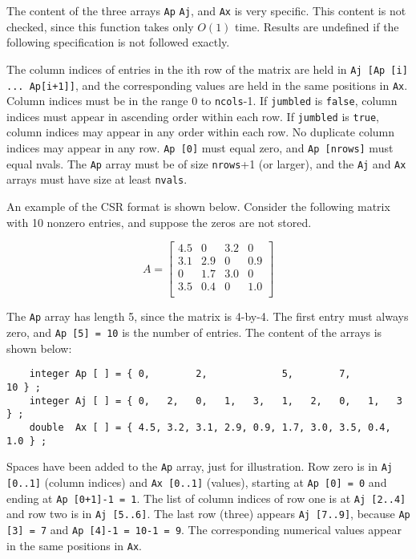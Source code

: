 The content of the three arrays \verb'Ap' \verb'Aj', and \verb'Ax' is very
specific.  This content is not checked, since this function takes only
$O(1)$ time.  Results are undefined if the following specification is not
followed exactly.

The column indices of entries in the ith row of the matrix are held in
\verb'Aj [Ap [i] ... Ap[i+1]]', and the corresponding values are held in the
same positions in \verb'Ax'.  Column indices must be in the range 0 to
\verb'ncols'-1.  If \verb'jumbled' is \verb'false', column indices must appear
in ascending order within each row.  If \verb'jumbled' is \verb'true', column
indices may appear in any order within each row.  No duplicate column indices
may appear in any row.  \verb'Ap [0]' must equal zero, and \verb'Ap [nrows]'
must equal nvals.  The \verb'Ap' array must be of size \verb'nrows'+1 (or
larger), and the \verb'Aj' and \verb'Ax' arrays must have size at least
\verb'nvals'.

An example of the CSR format is shown below.  Consider the following
matrix with 10 nonzero entries, and suppose the zeros are not stored.

    \begin{equation}
    \label{eqn:Aexample}
    A = \left[
    \begin{array}{cccc}
    4.5 &   0 & 3.2 &   0 \\
    3.1 & 2.9 &  0  & 0.9 \\
     0  & 1.7 & 3.0 &   0 \\
    3.5 & 0.4 &  0  & 1.0 \\
    \end{array}
    \right]
    \end{equation}

The \verb'Ap' array has length 5, since the matrix is 4-by-4.  The first entry
must always zero, and \verb'Ap [5] = 10' is the number of entries.
The content of the arrays is shown below:

{\footnotesize
\begin{verbatim}
    integer Ap [ ] = { 0,        2,             5,        7,            10 } ;
    integer Aj [ ] = { 0,   2,   0,   1,   3,   1,   2,   0,   1,   3   } ;
    double  Ax [ ] = { 4.5, 3.2, 3.1, 2.9, 0.9, 1.7, 3.0, 3.5, 0.4, 1.0 } ; \end{verbatim} }

Spaces have been added to the \verb'Ap' array, just for illustration.  Row zero
is in \verb'Aj [0..1]' (column indices) and \verb'Ax [0..1]' (values), starting
at \verb'Ap [0] = 0' and ending at \verb'Ap [0+1]-1 = 1'.  The list of column
indices of row one is at \verb'Aj [2..4]' and row two is in \verb'Aj [5..6]'.
The last row (three) appears \verb'Aj [7..9]', because \verb'Ap [3] = 7' and
\verb'Ap [4]-1 = 10-1 = 9'.  The corresponding numerical values appear in the
same positions in \verb'Ax'.

